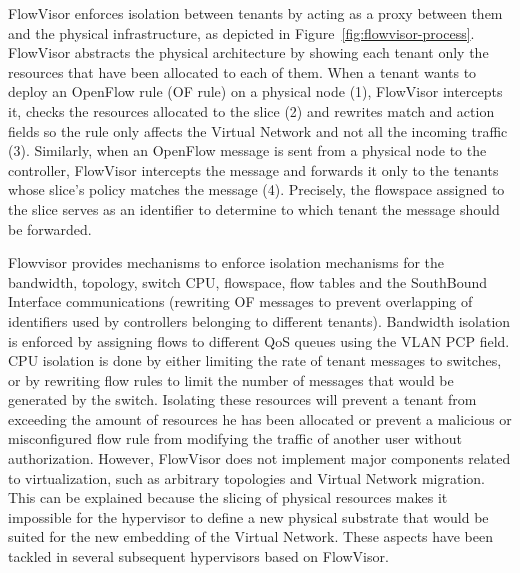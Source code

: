 FlowVisor enforces isolation between tenants by acting as a proxy between them and the physical infrastructure, as depicted in Figure~\ref{fig:flowvisor-process}.
FlowVisor abstracts the physical architecture by showing each tenant only the resources that have been allocated to each of them.
When a tenant wants to deploy an OpenFlow rule (OF rule) on a physical node (1), FlowVisor intercepts it, checks the resources allocated to the slice (2) and rewrites match and action fields so the rule only affects the Virtual Network and not all the incoming traffic (3).
Similarly, when an OpenFlow message is sent from a physical node to the controller, FlowVisor intercepts the message and forwards it only to the tenants whose slice's policy matches the message (4).
Precisely, the flowspace assigned to the slice serves as an identifier to determine to which tenant the message should be forwarded.

Flowvisor provides mechanisms to enforce isolation mechanisms for the bandwidth, topology, switch CPU, flowspace, flow tables and the SouthBound Interface communications (\ie rewriting OF messages to prevent overlapping of identifiers used by controllers belonging to different tenants).
Bandwidth isolation is enforced by assigning flows to different QoS queues using the VLAN PCP field.
CPU isolation is done by either limiting the rate of tenant messages to switches, or by rewriting flow rules to limit the number of messages that would be generated by the switch.
Isolating these resources will prevent a tenant from exceeding the amount of resources he has been allocated or prevent a malicious or misconfigured flow rule from modifying the traffic of another user without authorization.
However, FlowVisor does not implement major components related to virtualization, such as arbitrary topologies and Virtual Network migration.
This can be explained because the slicing of physical resources makes it impossible for the hypervisor to define a new physical substrate that would be suited for the new embedding of the Virtual Network.
These aspects have been tackled in several subsequent hypervisors based on FlowVisor.

